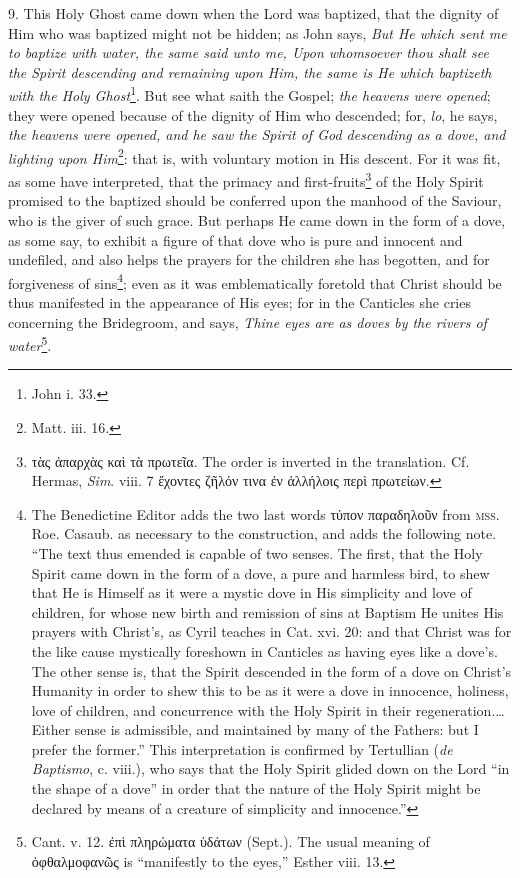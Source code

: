 9. This Holy Ghost came down when the Lord was baptized, that the dignity of Him who was baptized might not be hidden; as John says, \emph{But He which sent me to baptize with water, the same said unto me, Upon whomsoever thou shalt see the Spirit descending and remaining upon Him, the same is He which baptizeth with the Holy Ghost}\footnote{John i. 33.}. But see what saith the Gospel; \emph{the heavens were opened}; they were opened because of the dignity of Him who descended; for, \emph{lo}, he says, \emph{the heavens were opened, and he saw the Spirit of God descending as a dove, and lighting upon Him}\footnote{Matt. iii. 16.}: that is, with voluntary motion in His descent. For it was fit, as some have interpreted, that the primacy and first-fruits\footnote{\textgreek{τὰς ἀπαρχὰς καὶ τὰ πρωτεῖα}. The order is inverted in the translation. Cf. Hermas, \emph{Sim}. viii. 7 \textgreek{ἔχοντες ζῆλόν τινα ἐν ἀλλήλοις περὶ πρωτείων}.} of the Holy Spirit promised to the baptized should be conferred upon the manhood of the Saviour, who is the giver of such grace. But perhaps He came down in the form of a dove, as some say, to exhibit a figure of that dove who is pure and innocent and undefiled, and also helps the prayers for the children she has begotten, and for forgiveness of sins\footnote{The Benedictine Editor adds the two last words \textgreek{τύπον παραδηλοῦν} from \textsc{mss.} Roe. Casaub. as necessary to the construction, and adds the following note. “The text thus emended is capable of two senses. The first, that the Holy Spirit came down in the form of a dove, a pure and harmless bird, to shew that He is Himself as it were a mystic dove in His simplicity and love of children, for whose new birth and remission of sins at Baptism He unites His prayers with Christ’s, as Cyril teaches in Cat. xvi. 20: and that Christ was for the like cause mystically foreshown in Canticles as having eyes like a dove’s. The other sense is, that the Spirit descended in the form of a dove on Christ’s Humanity in order to shew this to be as it were a dove in innocence, holiness, love of children, and concurrence with the Holy Spirit in their regeneration.…Either sense is admissible, and maintained by many of the Fathers: but I prefer the former.” This interpretation is confirmed by Tertullian (\emph{de Baptismo}, c. viii.), who says that the Holy Spirit glided down on the Lord “in the shape of a dove” in order that the nature of the Holy Spirit might be declared by means of a creature of simplicity and innocence.”}; even as it was emblematically foretold that Christ should be thus manifested in the appearance of His eyes; for in the Canticles she cries concerning the Bridegroom, and says, \emph{Thine eyes are as doves by the rivers of water}\footnote{Cant. v. 12. \textgreek{ἐπὶ πληρώματα ὑδάτων} (Sept.). The usual meaning of \textgreek{ὀφθαλμοφανῶς} is “manifestly to the eyes,” Esther viii. 13.}.


